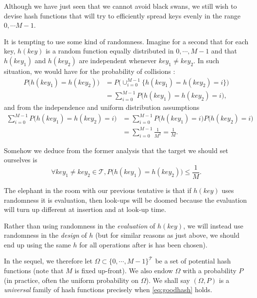\documentclass[12pt]{article}
\theoremstyle{plain}
\theoremstyle{remark}
\begin{document}
Although we have just seen that we cannot avoid black swans, we still wish to
devise hash functions that will try to efficiently spread keys evenly in the range
$0,\cdots M-1$. 

It is tempting to use some kind of randomness. Imagine for a second that
for each key, $h(key)$ is a random function equally distributed in ${0,\cdots,
M-1}$ and that $h(key_1)$ and $h(key_2)$ are independent whenever $key_1
\neq key_2.$ In such situation, we would have for the probability of collisions :
\begin{equation*}\begin{split}
	P\big(h(key_1) = h(key_2)\big) &= P\big(\cup_{i=0}^{M-1} \{h(key_1) = h(key_2) =
	i\}\big)\\
	&= \sum_{i=0}^{M-1} P\big(h(key_1) = h(key_2) = i\big),
\end{split}
\end{equation*}
and from the independence and uniform distribution assumptions
\begin{equation*}\begin{split}
	\sum_{i=0}^{M-1} P\big(h(key_1) = h(key_2) = i\big) &= \sum_{i=0}^{M-1}
	P\big(h(key_1)=i\big)P\big(h(key_2) = i\big)\\
	&= \sum_{i=0}^{M-1} \frac{1}{M^2} = \frac{1}{M}.
\end{split}
\end{equation*}

Somehow we deduce from the former analysis that the target we should set
ourselves is 
\begin{equation}\label{eq:goodhash}
	\forall key_1 \neq key_2 \in \mathcal{T}, P\big( h(key_1) = h(key_2)\big) \leq \frac{1}{M}.
\end{equation}

The elephant in the room with our previous tentative is that if $h(key)$ uses
randomness it is evaluation, then look-ups will be doomed because the evaluation
will turn up different at insertion and at look-up time. 

Rather than using randomness in the {\it evaluation} of $h(key)$, we will instead
use randomness in the {\it design} of $h$ (but for similar reasons as just above, we 
should end up using the same $h$ for all operations after is has been chosen).

In the sequel, we therefore let $\Omega \subset \{0,\cdots, M-1\}^\mathcal{T}$
be a set of potential hash functions (note that $M$ is fixed up-front). We also 
endow $\Omega$ with a probability $P$ (in practice, often the uniform
probability on $\Omega$). We shall say $(\Omega,P)$ is a {\it universal} family
of hash functions precisely
when \eqref{eq:goodhash} holds.
\end{document}

